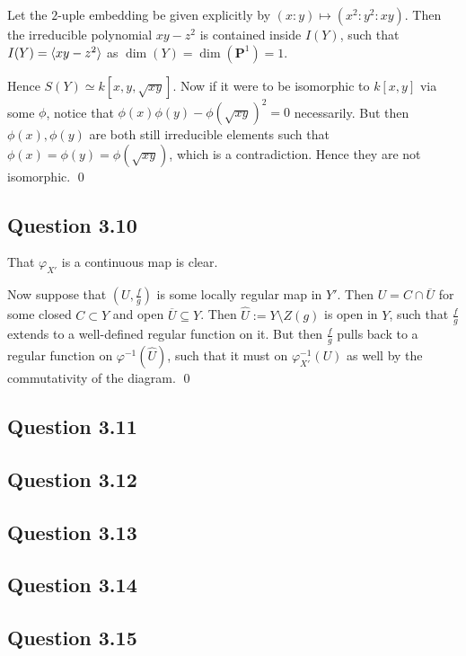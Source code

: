\documentclass{article}
\begin{document}
Let the $2$-uple embedding be given explicitly by $(x:y) \mapsto (x^2:y^2:xy)$. Then the irreducible polynomial $xy - z^2$ is contained inside $I(Y)$, such that $I(Y) = \langle xy-z^2\rangle$ as $\dim(Y) = \dim(\mathbf{P}^1) = 1$.

Hence $S(Y) \simeq k[x,y, \sqrt{xy}]$. Now if it were to be isomorphic to $k[x,y]$ via some $\phi$, notice that $\phi(x)\phi(y) - \phi(\sqrt{xy})^2=0$ necessarily. But then $\phi(x),\phi(y)$ are both still irreducible elements such that $\phi(x) = \phi(y) = \phi(\sqrt{xy})$, which is a contradiction. Hence they are not isomorphic. \qed
\lspace

\subsection*{Question 3.10}

That $\varphi_{X'}$ is a continuous map is clear.

Now suppose that $(U, \frac{f}{g})$ is some locally regular map in $Y'$. Then $U = C \cap \overline U$ for some closed $C \subset Y$ and open $\overline U \subseteq Y$. Then $\hat U := Y \setminus Z(g)$ is open in $Y$, such that $\frac{f}{g}$ extends to a well-defined regular function on it. But then $\frac{f}{g}$ pulls back to a regular function on $\varphi^{-1}(\hat U)$, such that it must on $\varphi^{-1}_{X'}(U)$ as well by the commutativity of the diagram. \qed
\lspace

\subsection*{Question 3.11}



\subsection*{Question 3.12}



\subsection*{Question 3.13}



\subsection*{Question 3.14}



\subsection*{Question 3.15}
\end{document}
